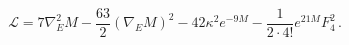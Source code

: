 \begin{equation}
\mathcal{L}=7\nabla ^{2}_{E}M-\frac{63}{2}(\nabla _{E}M)^{2}-42\kappa ^{2}e^{-9M}-\frac{1}{2\cdot 4!}e^{21M}F_{4}^{2}\, .
\end{equation}

